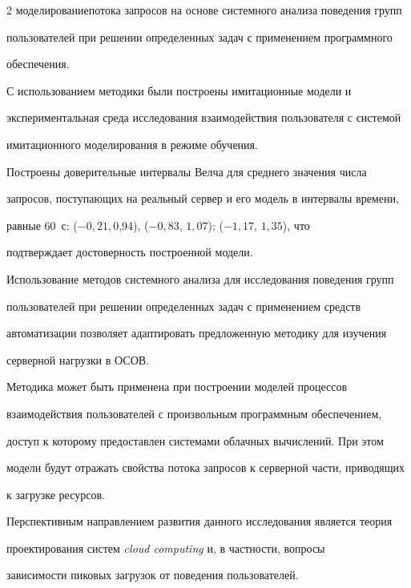 \begin{multicols}{2}
моделирование\linebreak потока запросов на основе системного анализа поведения групп 

пользователей при решении определенных задач с применением программного 

обеспечения. 

  

  С использованием методики были построены имитационные модели и 

экспериментальная среда исследования взаимодействия пользователя с сис\-те\-мой 

имитационного моделирования в режиме обучения. 

  

  Построены доверительные интервалы Велча для среднего значения числа 

запросов, поступающих на реальный сервер и его модель в интервалы времени, 

равные 60~с: ($-0{,}21$,\,0,94), ($-0{,}83,\,1,07$); ($-1{,}17,\,1,35$), что 

подтверждает достоверность построенной модели.

  

  Использование методов системного анализа для исследования поведения групп 

пользователей при решении определенных задач с применением средств 

автоматизации позволяет адаптировать предложенную методику для изучения 

серверной нагрузки в ОСОВ.

  

  Методика может быть применена при построении моделей процессов 

взаимодействия пользователей с произвольным программным обеспечением, 

доступ к которому предоставлен системами облачных вычислений. При этом 

модели будут отражать свойства потока запросов к серверной части, приводящих 

к загрузке ресурсов.

  

  Перспективным направлением развития данного исследования является теория 

проектирования систем \textit{cloud computing} и, в частности, вопросы 

зависимости пиковых загрузок от поведения пользователей.




\end{multicols}
